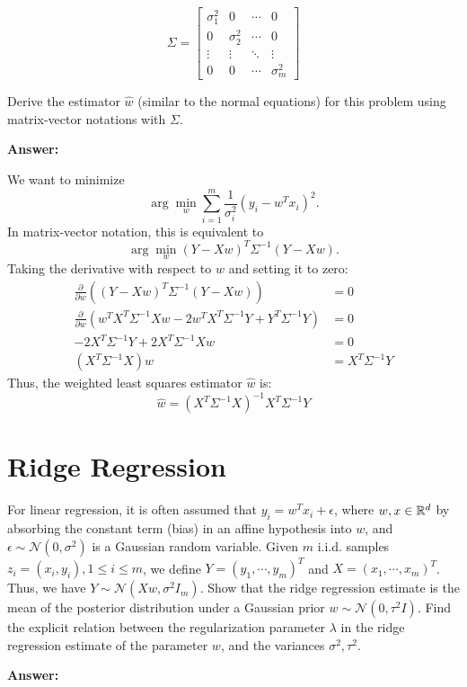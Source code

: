 \documentclass{article}
\begin{document}
$$\Sigma = \begin{bmatrix}
    \sigma_1^2 & 0 & \cdots & 0\\
    0 & \sigma_2^2 & \cdots & 0\\
    \vdots & \vdots & \ddots & \vdots\\
    0 & 0 & \cdots & \sigma_m^2
\end{bmatrix}$$

Derive the estimator $\hat{w}$ (similar to the normal equations) for this problem using matrix-vector notations with $\Sigma$.

\textbf{Answer:}

We want to minimize
$$\arg\min_w \sum_{i=1}^{m} \frac{1}{\sigma_i^2}(y_i - w^T x_i)^2.$$
In matrix-vector notation, this is equivalent to
$$\arg\min_w (Y - Xw)^T \Sigma^{-1} (Y - Xw).$$
Taking the derivative with respect to $w$ and setting it to zero:
\begin{align*}
    \frac{\partial}{\partial w}\left((Y - Xw)^T \Sigma^{-1} (Y - Xw)\right) &= 0\\
    \frac{\partial}{\partial w}\left(w^T X^T \Sigma^{-1} X w - 2w^T X^T \Sigma^{-1} Y + Y^T \Sigma^{-1} Y\right) &= 0\\
    -2X^T \Sigma^{-1} Y + 2X^T \Sigma^{-1} Xw &= 0\\
    (X^T \Sigma^{-1} X)w &= X^T \Sigma^{-1} Y
\end{align*}
Thus, the weighted least squares estimator $\hat{w}$ is:
$$\hat{w} = (X^T \Sigma^{-1} X)^{-1} X^T \Sigma^{-1} Y$$

\section{Ridge Regression}

For linear regression, it is often assumed that $y_i = w^Tx_i + \epsilon$, where $w, x \in \mathbb{R}^d$ by absorbing the constant term (bias) in an affine hypothesis into $w$, and $\epsilon \sim \mathcal{N}(0, \sigma^2)$ is a Gaussian random variable.
Given $m$ i.i.d. samples $z_i = (x_i, y_i), 1 \leq i \leq m$, we define $Y = (y_1, \cdots, y_m)^T$ and $X = (x_1, \cdots, x_m)^T$.
Thus, we have $Y \sim \mathcal{N}(Xw, \sigma^2I_m)$.
Show that the ridge regression estimate is the mean of the posterior distribution under a Gaussian prior $w \sim \mathcal{N}(0, \tau^2I).$
Find the explicit relation between the regularization parameter $\lambda$ in the ridge regression estimate of the parameter $w$, and the variances $\sigma^2, \tau^2$.

\textbf{Answer:}
\end{document}

